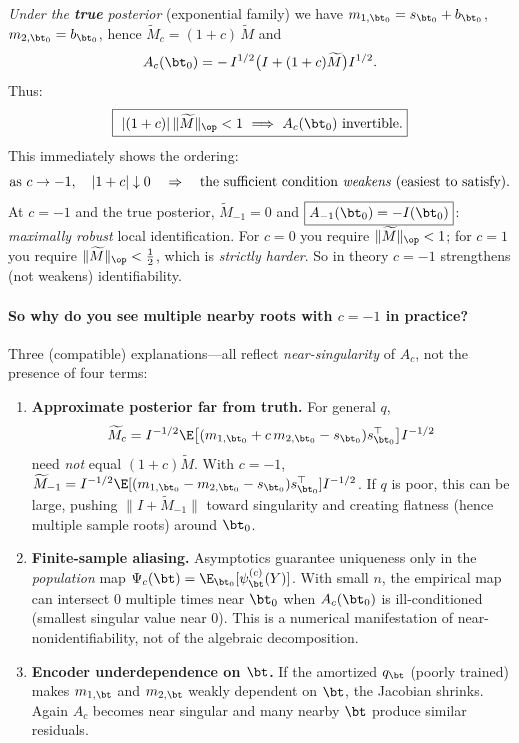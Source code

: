\emph{Under the \textbf{true} posterior} (exponential family) we have
\(m_{1,\bt_0}=s_{\bt_0}+b_{\bt_0}\), \(m_{2,\bt_0}=b_{\bt_0}\),
hence \(\widetilde M_c=(1+c)\,\widetilde M\) and
\[
A_c(\bt_0)=-\,I^{1/2}\big(I+(1+c)\widetilde M\big)I^{1/2}.
\]
Thus:
\[
\boxed{\
|(1+c)|\,\|\widetilde M\|_{\op}<1\ \Longrightarrow\ A_c(\bt_0)\ \text{invertible}.
}
\]
This immediately shows the ordering:
\[
\text{as }c\to -1,\quad |1+c|\downarrow 0\quad\Rightarrow\quad
\text{the sufficient condition \emph{weakens} (easiest to satisfy).}
\]
At \(c=-1\) and the true posterior, \(\widetilde M_{-1}=0\) and
\(\boxed{A_{-1}(\bt_0)=-I(\bt_0)}\): \emph{maximally robust} local
identification. For \(c=0\) you require \(\|\widetilde M\|_{\op}<1\); for \(c=1\)
you require \(\|\widetilde M\|_{\op}<\tfrac12\), which is \emph{strictly
harder}. So in theory \(c=-1\) strengthens (not weakens) identifiability.

\paragraph{So why do you see multiple nearby roots with \(c=-1\) in practice?}
Three (compatible) explanations—all reflect \emph{near-singularity} of \(A_c\), not
the presence of four terms:

\begin{enumerate}
\item \textbf{Approximate posterior far from truth.}
For general \(q\),
\[
\widetilde M_c
= I^{-1/2}\E\big[(m_{1,\bt_0}+c\,m_{2,\bt_0}-s_{\bt_0})s_{\bt_0}^\top\big]I^{-1/2}
\]
need \emph{not} equal \((1+c)\widetilde M\). With \(c=-1\),
\(\widetilde M_{-1}=I^{-1/2}\E[(m_{1,\bt_0}-m_{2,\bt_0}-s_{\bt_0})s_{\bt_0}^\top]I^{-1/2}\).
If \(q\) is poor, this can be large, pushing \(\|I+\widetilde M_{-1}\|\) toward singularity and creating flatness (hence multiple sample roots) around \(\bt_0\).

\item \textbf{Finite-sample aliasing.}
Asymptotics guarantee uniqueness only in the \emph{population} map
\(\Psi_c(\bt)=\E_{\bt_0}[\psi_\bt^{(c)}(Y)]\).
With small \(n\), the empirical map can intersect \(0\) multiple times near \(\bt_0\)
when \(A_c(\bt_0)\) is ill-conditioned (smallest singular value near 0).
This is a numerical manifestation of near-nonidentifiability, not of the
algebraic decomposition.

\item \textbf{Encoder underdependence on \(\bt\).}
If the amortized \(q_\bt\) (poorly trained) makes \(m_{1,\bt}\) and \(m_{2,\bt}\)
weakly dependent on \(\bt\), the Jacobian shrinks. Again \(A_c\) becomes
near singular and many nearby \(\bt\) produce similar residuals.
\end{enumerate}

